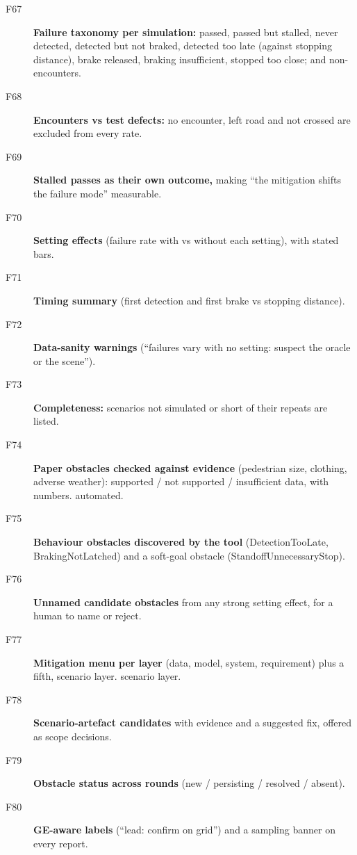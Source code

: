 \begin{description}
\item[F67] \textbf{Failure taxonomy per simulation:} passed, passed but stalled, never detected, detected but not braked, detected too late (against stopping distance), brake released, braking insufficient, stopped too close; and non-encounters. \tagnew{} 
\item[F68] \textbf{Encounters vs test defects:} no encounter, left road and not crossed are excluded from every rate. \tagnew{}
\item[F69] \textbf{Stalled passes as their own outcome,} making ``the mitigation shifts the failure mode'' measurable. 
\item[F70] \textbf{Setting effects} (failure rate with vs without each setting), with stated bars. \tagnew{}
\item[F71] \textbf{Timing summary} (first detection and first brake vs stopping distance). \tagnew{}
\item[F72] \textbf{Data-sanity warnings} (``failures vary with no setting: suspect the oracle or the scene''). \tagnew{}
\item[F73] \textbf{Completeness:} scenarios not simulated or short of their repeats are listed. \taginfra
\item[F74] \textbf{Paper obstacles checked against evidence} (pedestrian size, clothing, adverse weather): supported / not supported / insufficient data, with numbers.  \tagnew{} automated.
\item[F75] \textbf{Behaviour obstacles discovered by the tool} (DetectionTooLate, BrakingNotLatched) and a soft-goal obstacle (StandoffUnnecessaryStop). \tagnew{}
\item[F76] \textbf{Unnamed candidate obstacles} from any strong setting effect, for a human to name or reject. \tagnew{}
\item[F77] \textbf{Mitigation menu per layer} (data, model, system, requirement) plus a fifth, scenario layer.  \tagnew{} scenario layer.
\item[F78] \textbf{Scenario-artefact candidates} with evidence and a suggested fix, offered as scope decisions. \tagnew{}
\item[F79] \textbf{Obstacle status across rounds} (new / persisting / resolved / absent). \tagnew{}
\item[F80] \textbf{GE-aware labels} (``lead: confirm on grid'') and a sampling banner on every report. \tagnew{}

\end{description}
